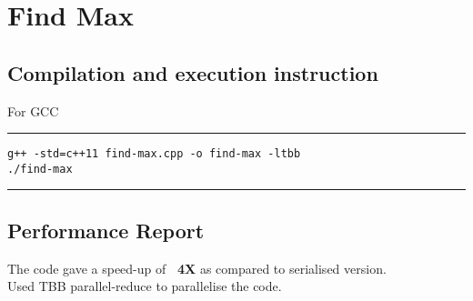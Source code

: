 \documentclass[a4paper]{article}
\begin{document}
\section{\Huge Find Max}
\vspace{0.5cm}
\subsection{Compilation and execution instruction }
\vspace{0.3cm}
For GCC
\vspace{0.2cm}
\hrule
\begin{lstlisting}
g++ -std=c++11 find-max.cpp -o find-max -ltbb
./find-max
\end{lstlisting}
\hrule 
\vspace{0.5cm}

\subsection{Performance Report}
The code gave a speed-up of {\bf ~4X} as compared to serialised version.\\
\newline
Used TBB parallel-reduce to parallelise the code. 
\end{document}

